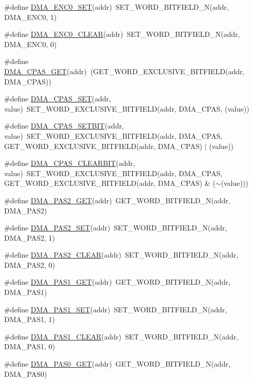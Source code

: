 \begin{DoxyCompactItemize}
\item 
\#define \hyperlink{a00548_a41816e1e2d17581d6d4e39c3f8e5fa3b}{DMA\_\-ENC0\_\-SET}(addr)~SET\_\-WORD\_\-BITFIELD\_\-N(addr, DMA\_\-ENC0, 1)
\item 
\#define \hyperlink{a00548_a05477e1d32364f3028faf9583a0ecc4a}{DMA\_\-ENC0\_\-CLEAR}(addr)~SET\_\-WORD\_\-BITFIELD\_\-N(addr, DMA\_\-ENC0, 0)
\item 
\#define \hyperlink{a00548_a06ec213c4739ce129c412bdc07da32de}{DMA\_\-CPAS\_\-GET}(addr)~(GET\_\-WORD\_\-EXCLUSIVE\_\-BITFIELD(addr, DMA\_\-CPAS))
\item 
\#define \hyperlink{a00548_aec46117ebb2484e01b1c6ec08e34e0bd}{DMA\_\-CPAS\_\-SET}(addr, value)~SET\_\-WORD\_\-EXCLUSIVE\_\-BITFIELD(addr, DMA\_\-CPAS, (value))
\item 
\#define \hyperlink{a00548_a17ff472cf476515ca65930ad761be2c8}{DMA\_\-CPAS\_\-SETBIT}(addr, value)~SET\_\-WORD\_\-EXCLUSIVE\_\-BITFIELD(addr, DMA\_\-CPAS, GET\_\-WORD\_\-EXCLUSIVE\_\-BITFIELD(addr, DMA\_\-CPAS) $|$ (value))
\item 
\#define \hyperlink{a00548_a5640a97bbded69a94b64dbdf58558012}{DMA\_\-CPAS\_\-CLEARBIT}(addr, value)~SET\_\-WORD\_\-EXCLUSIVE\_\-BITFIELD(addr, DMA\_\-CPAS, GET\_\-WORD\_\-EXCLUSIVE\_\-BITFIELD(addr, DMA\_\-CPAS) \& ($\sim$(value)))
\item 
\#define \hyperlink{a00548_ab869c659c2deb25530ceafb62cab2a07}{DMA\_\-PAS2\_\-GET}(addr)~GET\_\-WORD\_\-BITFIELD\_\-N(addr, DMA\_\-PAS2)
\item 
\#define \hyperlink{a00548_ada0633045910c4a0babd3fcd18496499}{DMA\_\-PAS2\_\-SET}(addr)~SET\_\-WORD\_\-BITFIELD\_\-N(addr, DMA\_\-PAS2, 1)
\item 
\#define \hyperlink{a00548_a51d218ed474b3e25ff16449483527f43}{DMA\_\-PAS2\_\-CLEAR}(addr)~SET\_\-WORD\_\-BITFIELD\_\-N(addr, DMA\_\-PAS2, 0)
\item 
\#define \hyperlink{a00548_a5656f7b79aa5b43b4b4c34ace9cacf25}{DMA\_\-PAS1\_\-GET}(addr)~GET\_\-WORD\_\-BITFIELD\_\-N(addr, DMA\_\-PAS1)
\item 
\#define \hyperlink{a00548_aab0938f2db8d35f71d29b176c34e53b0}{DMA\_\-PAS1\_\-SET}(addr)~SET\_\-WORD\_\-BITFIELD\_\-N(addr, DMA\_\-PAS1, 1)
\item 
\#define \hyperlink{a00548_afc7af68efd018a1416d6e107403e64ed}{DMA\_\-PAS1\_\-CLEAR}(addr)~SET\_\-WORD\_\-BITFIELD\_\-N(addr, DMA\_\-PAS1, 0)
\item 
\#define \hyperlink{a00548_a634350a396d214f4538b39c3784e0950}{DMA\_\-PAS0\_\-GET}(addr)~GET\_\-WORD\_\-BITFIELD\_\-N(addr, DMA\_\-PAS0)

\end{DoxyCompactItemize}

